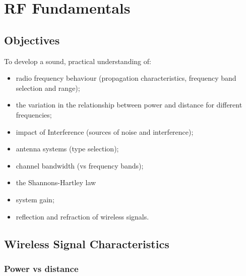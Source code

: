 \chapter{RF Fundamentals}\label{fundamentals}

\minitoc 

\clearpage
\section*{Objectives}
To develop a sound, practical understanding of:
\begin{itemize}

\item radio frequency behaviour (propagation characteristics, frequency band selection and range);

\item the variation in the relationship between power and distance for different frequencies;

\item impact of Interference (sources of noise and interference);

\item antenna systems (type selection);

\item channel bandwidth (vs frequency bands);

\item the Shannons-Hartley law
 
\item system gain; 

\item reflection and refraction of wireless signals.

\end{itemize}


\section{Wireless Signal Characteristics}

\subsection{Power vs distance}


